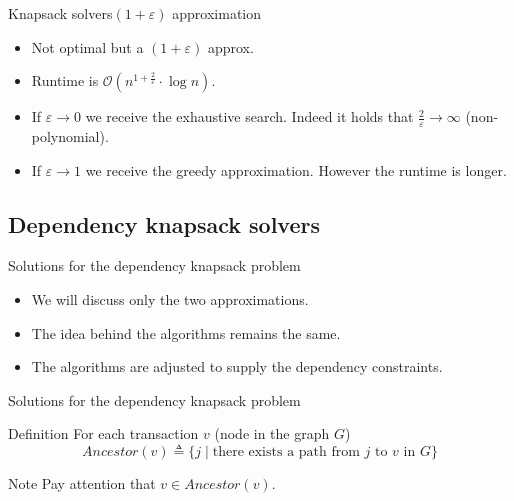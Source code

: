 \documentclass{beamer}
\begin{document}
\begin{frame}{Knapsack solvers}{$(1+\varepsilon)$ approximation} %
    \begin{itemize}
        \item {Not optimal but a $(1+\varepsilon)$ approx.}
        \item {Runtime is $\mathcal{O}(n^{1+\frac{2}{\varepsilon}}\cdot
        \log{n})$.}
        \item {If $\varepsilon \to 0$ we receive the exhaustive search. 
        Indeed it holds that $\frac{2}{\varepsilon} \to \infty$ 
        (non-polynomial).}
        \item {If $\varepsilon \to 1$ we receive the greedy approximation. 
        However the runtime is longer.}
    \end{itemize}
\end{frame}

\subsection* {Dependency knapsack solvers}

\begin{frame}{Solutions for the dependency knapsack problem} %
    \begin{itemize}
        \item {We will discuss only the two approximations.}
        \item {The idea behind the algorithms remains the same.}
        \item {The algorithms are adjusted to supply the dependency 
        constraints.}
    \end{itemize}
    
\end{frame}

\begin{frame}{Solutions for the dependency knapsack problem} %
        \begin{block}{Definition}
        For each transaction $v$ (node in the graph $G$)
        $$ Ancestor(v) \triangleq \{ j \mid \text{there exists a path from } 
        j \text{ to } v \text{ in } G \} $$
        \end{block}
        \begin{block}{Note}
        Pay attention that $v \in Ancestor(v)$.
        \end{block}
    
\end{frame}
\end{document}
